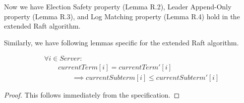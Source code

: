 Now we have Election Safety property (Lemma R.2), Leader Append-Only property (Lemma R.3), and Log Matching property (Lemma R.4) hold in the extended Raft algorithm.

Similarly, we have following lemmas specific for the extended Raft algorithm.

\begin{displaymath}
	\begin{aligned}
		 & \forall i \in Server: \\
		 & \qquad currentTerm[i]=currentTerm'[i] \\
		 & \qquad \qquad \implies currentSubterm[i] \le currentSubterm'[i]
	\end{aligned}
\end{displaymath}
\begin{proof}
	This follows immediately from the specification.
\end{proof}

